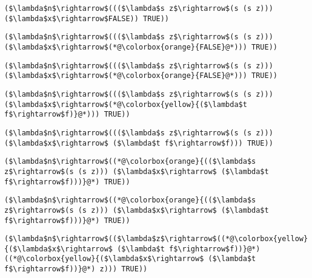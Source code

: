 \documentclass{beamer}
\begin{document}
\begin{frame}[fragile]{\CurrentSection}
\lstset{basicstyle=\ttfamily\small}\lstset{numbers=none}\lstset{language=ML}\begin{lstlisting}
($\lambda$n$\rightarrow$((($\lambda$s z$\rightarrow$(s (s z))) ($\lambda$x$\rightarrow$FALSE)) TRUE))
\end{lstlisting}
\pause\lstset{language=ML}\begin{lstlisting}
($\lambda$n$\rightarrow$((($\lambda$s z$\rightarrow$(s (s z))) ($\lambda$x$\rightarrow$(*@\colorbox{orange}{FALSE}@*))) TRUE))
\end{lstlisting}

\end{frame}

\begin{frame}[fragile]{\CurrentSection}
\lstset{basicstyle=\ttfamily\small}\lstset{numbers=none}\lstset{language=ML}\begin{lstlisting}
($\lambda$n$\rightarrow$((($\lambda$s z$\rightarrow$(s (s z))) ($\lambda$x$\rightarrow$(*@\colorbox{orange}{FALSE}@*))) TRUE))
\end{lstlisting}
\pause\lstset{language=ML}\begin{lstlisting}
($\lambda$n$\rightarrow$((($\lambda$s z$\rightarrow$(s (s z))) ($\lambda$x$\rightarrow$(*@\colorbox{yellow}{($\lambda$t f$\rightarrow$f)}@*))) TRUE))
\end{lstlisting}

\end{frame}

\begin{frame}[fragile]{\CurrentSection}
\lstset{basicstyle=\ttfamily\small}\lstset{numbers=none}\lstset{language=ML}\begin{lstlisting}
($\lambda$n$\rightarrow$((($\lambda$s z$\rightarrow$(s (s z))) ($\lambda$x$\rightarrow$ ($\lambda$t f$\rightarrow$f))) TRUE))
\end{lstlisting}
\pause\lstset{language=ML}\begin{lstlisting}
($\lambda$n$\rightarrow$((*@\colorbox{orange}{(($\lambda$s z$\rightarrow$(s (s z))) ($\lambda$x$\rightarrow$ ($\lambda$t f$\rightarrow$f)))}@*) TRUE))
\end{lstlisting}

\end{frame}

\begin{frame}[fragile]{\CurrentSection}
\lstset{basicstyle=\ttfamily\small}\lstset{numbers=none}\lstset{language=ML}\begin{lstlisting}
($\lambda$n$\rightarrow$((*@\colorbox{orange}{(($\lambda$s z$\rightarrow$(s (s z))) ($\lambda$x$\rightarrow$ ($\lambda$t f$\rightarrow$f)))}@*) TRUE))
\end{lstlisting}
\pause\lstset{language=ML}\begin{lstlisting}
($\lambda$n$\rightarrow$(($\lambda$z$\rightarrow$((*@\colorbox{yellow}{($\lambda$x$\rightarrow$ ($\lambda$t f$\rightarrow$f))}@*) ((*@\colorbox{yellow}{($\lambda$x$\rightarrow$ ($\lambda$t f$\rightarrow$f))}@*) z))) TRUE))
\end{lstlisting}

\end{frame}
\end{document}
